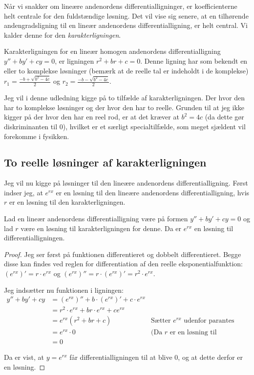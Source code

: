 Når vi snakker om lineære andenordens differentialligninger, er koefficienterne helt centrale for den fuldstændige løsning. 
Det vil vise sig senere, at en tilhørende andengradsligning til en lineær andenordens differentialligning, er helt central. Vi kalder denne for den \textit{karakterligningen}.

\begin{definition}[Karakterligningen]
Karakterligningen for en lineær homogen andenordens differentialligning $y'' + by' + cy = 0$, er ligningen $r^2 + br + c = 0$. 
Denne ligning har som bekendt en eller to komplekse løsninger (bemærk at de reelle tal er indeholdt i de komplekse) $r_1 = \frac{-b + \sqrt{b^2 - 4c}}{2}$ og $r_2 = \frac{-b - \sqrt{b^2 - 4c}}{2}$.
\end{definition}

Jeg vil i denne udledning kigge på to tilfælde af karakterligningen. 
Der hvor den har to komplekse løsninger og der hvor den har to reelle.
Grunden til at jeg ikke kigger på der hvor den har en reel rod, er at det kræver at $b^2 = 4c$ (da dette gør diskriminanten til $0$), hvilket er et særligt specialtilfælde, som meget sjældent vil forekomme i fysikken.

\subsection{To reelle løsninger af karakterligningen}
Jeg vil nu kigge på løsninger til den lineære andenordens differentialligning. 
Først indser jeg, at $e^{rx}$ er en løsning til den lineære andenordens differentialligning, hvis $r$ er en løsning til den karakterligningen.

\begin{thm}\label{thm: e^rx er en losning}
Lad en lineær andenordens differentialligning være på formen $y'' + by' + cy = 0$ og lad $r$ være en løsning til karakterligningen for denne.
Da er $e^{rx}$ en løsning til differentialligningen. 
\end{thm}

\begin{proof}
Jeg ser først på funktionen differentieret og dobbelt differentieret. 
Begge disse kan findes ved reglen for differentiation af den reelle eksponentialfunktion: 
$(e^{rx})' = r \cdot e^{rx}$ og 
$(e^{rx})'' = r\cdot (e^{rx})' = r^2 \cdot e^{rx}$.

Jeg indsætter nu funktionen i ligningen:
\begin{align*}
y'' + by' + cy 	&= (e^{rx})'' + b\cdot (e^{rx})' + c\cdot e^{rx} \\
				&= r^2 \cdot e^{rx} + br\cdot e^{rx} + c e^{rx} \\
				&= e^{rx} (r^2 + br + c)  & \text{Sætter $e^{rx}$ udenfor parantes}\\
				&= e^{rx} \cdot 0 		& \text{(Da $r$ er en løsning til karakterligningen)}\\
				&=0
\end{align*}

Da er vist, at $y=e^{rx}$ får differentialligningen til at blive $0$, og at dette derfor er en løsning. 
\end{proof}

